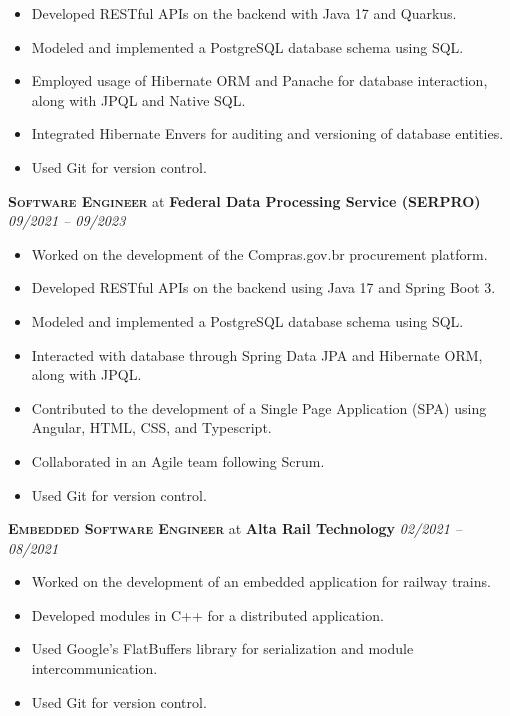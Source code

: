 \documentclass[a4paper,12pt]{article}
\begin{document}
{\small
\begin{itemize}[leftmargin=*,label=\large\textbullet]
    \setlength\itemsep{-0.2em}
    \item Developed RESTful APIs on the backend with Java 17 and Quarkus.
    \item Modeled and implemented a PostgreSQL database schema using SQL.
    \item Employed usage of Hibernate ORM and Panache for database interaction, along with JPQL and Native SQL.
    \item Integrated Hibernate Envers for auditing and versioning of database entities.
    \item Used Git for version control.
\end{itemize}
}

\textbf{\textsc{Software Engineer}} at \textbf{Federal Data Processing Service (SERPRO)} \hfill \textit{09/2021 -- 09/2023}

{\small
\begin{itemize}[leftmargin=*,label=\large\textbullet]
    \setlength\itemsep{-0.2em}
    \item Worked on the development of the Compras.gov.br procurement platform.
    \item Developed RESTful APIs on the backend using Java 17 and Spring Boot 3.
    \item Modeled and implemented a PostgreSQL database schema using SQL.
    \item Interacted with database through Spring Data JPA and Hibernate ORM, along with JPQL.
    \item Contributed to the development of a Single Page Application (SPA) using Angular, HTML, CSS, and Typescript.
    \item Collaborated in an Agile team following Scrum.
    \item Used Git for version control.
\end{itemize}
}

\textbf{\textsc{Embedded Software Engineer}} at \textbf{Alta Rail Technology} \hfill \textit{02/2021 -- 08/2021}

{\small
\begin{itemize}[leftmargin=*,label=\large\textbullet]
    \setlength\itemsep{-0.2em}
    \item Worked on the development of an embedded application for railway trains.
    \item Developed modules in C++ for a distributed application.
    \item Used Google's FlatBuffers library for serialization and module intercommunication.
    \item Used Git for version control.
\end{itemize}
}
\end{document}
